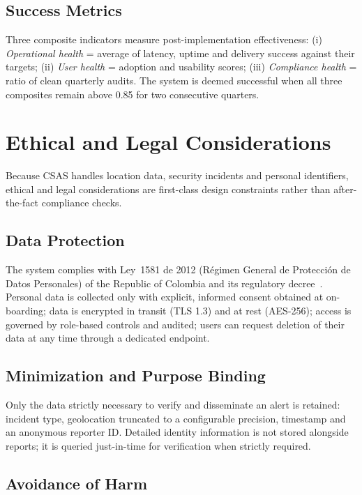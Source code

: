 \documentclass[conference,a4paper,10pt]{IEEEtran}
\begin{document}
\subsection{Success Metrics}

Three composite indicators measure post-implementation effectiveness:
(i) \emph{Operational health} = average of latency, uptime and delivery
success against their targets; (ii) \emph{User health} = adoption and
usability scores; (iii) \emph{Compliance health} = ratio of clean
quarterly audits. The system is deemed successful when all three
composites remain above 0.85 for two consecutive quarters.

\section{Ethical and Legal Considerations}
\label{sec:ethics}

Because CSAS handles location data, security incidents and personal
identifiers, ethical and legal considerations are first-class design
constraints rather than after-the-fact compliance checks.

\subsection{Data Protection}

The system complies with Ley~1581 de 2012 (Régimen General de Protección
de Datos Personales) of the Republic of Colombia and its regulatory
decree~\cite{ley1581}. Personal data is collected only with explicit,
informed consent obtained at on-boarding; data is encrypted in transit
(TLS 1.3) and at rest (AES-256); access is governed by role-based
controls and audited; users can request deletion of their data at any
time through a dedicated endpoint.

\subsection{Minimization and Purpose Binding}

Only the data strictly necessary to verify and disseminate an alert is
retained: incident type, geolocation truncated to a configurable
precision, timestamp and an anonymous reporter ID. Detailed identity
information is not stored alongside reports; it is queried just-in-time
for verification when strictly required.

\subsection{Avoidance of Harm}
\end{document}

